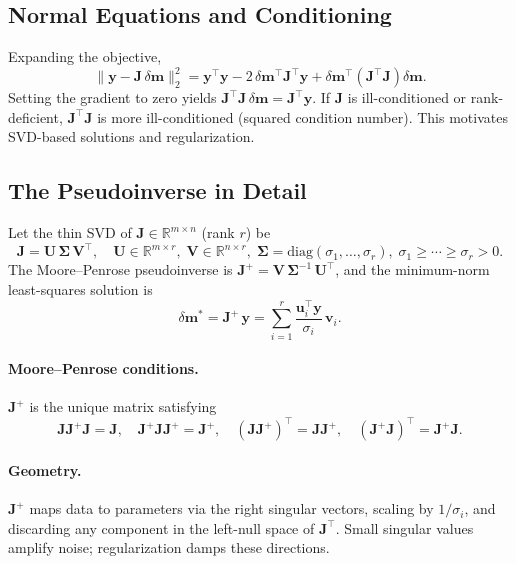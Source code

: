 \documentclass[11pt,a4paper]{article}
\begin{document}
\subsection{Normal Equations and Conditioning}
Expanding the objective,
\[
\|\mathbf{y}-\mathbf{J}\,\delta\mathbf{m}\|_2^2
= \mathbf{y}^\top\mathbf{y} - 2\,\delta\mathbf{m}^\top \mathbf{J}^\top \mathbf{y}
+ \delta\mathbf{m}^\top (\mathbf{J}^\top \mathbf{J}) \delta\mathbf{m}.
\]
Setting the gradient to zero yields $\mathbf{J}^\top \mathbf{J}\,\delta\mathbf{m}=\mathbf{J}^\top \mathbf{y}$. If $\mathbf{J}$ is ill-conditioned or rank-deficient, $\mathbf{J}^\top \mathbf{J}$ is more ill-conditioned (squared condition number). This motivates SVD-based solutions and regularization.

\subsection{The Pseudoinverse in Detail}\label{subsec:pseudo}
Let the thin SVD of $\mathbf{J}\in\mathbb{R}^{m\times n}$ (rank $r$) be
\[
\mathbf{J} = \mathbf{U}\,\bm{\Sigma}\,\mathbf{V}^\top, \quad
\mathbf{U}\in\mathbb{R}^{m\times r},\; \mathbf{V}\in\mathbb{R}^{n\times r},\;
\bm{\Sigma}=\mathrm{diag}(\sigma_1,\ldots,\sigma_r),\; \sigma_1\ge\cdots\ge\sigma_r>0.
\]
The Moore--Penrose pseudoinverse is $\mathbf{J}^+ = \mathbf{V}\,\bm{\Sigma}^{-1}\,\mathbf{U}^\top$, and the minimum-norm least-squares solution is
\[
\delta\mathbf{m}^* = \mathbf{J}^+\,\mathbf{y}
= \sum_{i=1}^r \frac{\mathbf{u}_i^\top \mathbf{y}}{\sigma_i}\,\mathbf{v}_i.
\]
\paragraph{Moore--Penrose conditions.} $\mathbf{J}^+$ is the unique matrix satisfying
\[
\mathbf{J}\mathbf{J}^+\mathbf{J}=\mathbf{J},\quad
\mathbf{J}^+\mathbf{J}\mathbf{J}^+=\mathbf{J}^+,\quad
(\mathbf{J}\mathbf{J}^+)^\top=\mathbf{J}\mathbf{J}^+,\quad
(\mathbf{J}^+\mathbf{J})^\top=\mathbf{J}^+\mathbf{J}.
\]
\paragraph{Geometry.} $\mathbf{J}^+$ maps data to parameters via the right singular vectors, scaling by $1/\sigma_i$, and discarding any component in the left-null space of $\mathbf{J}^\top$. Small singular values amplify noise; regularization damps these directions.
\end{document}
